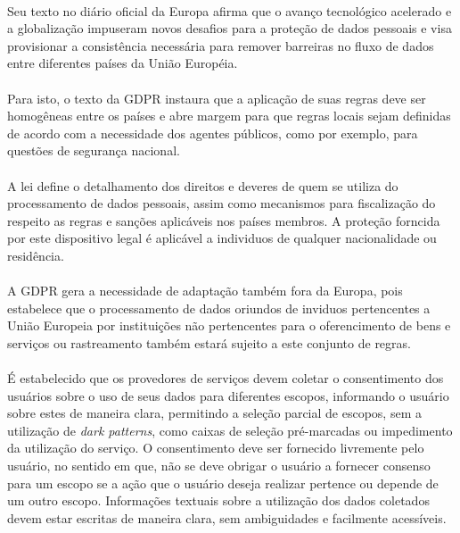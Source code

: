 \paragraph{} Seu texto no diário oficial da Europa afirma que o avanço tecnológico acelerado
e a globalização impuseram novos desafios para a proteção de dados pessoais\cite{eu-2016-679} e visa provisionar a consistência necessária para remover barreiras no fluxo de dados entre diferentes países da União Européia. 

\paragraph{} Para isto, o texto da GDPR instaura que a aplicação de suas regras deve ser homogêneas entre os países e abre margem para que regras locais sejam definidas de acordo com a necessidade dos agentes públicos, como por exemplo, para questões de segurança nacional.

\paragraph{} A lei define o detalhamento dos direitos e deveres de quem se utiliza do processamento de dados pessoais, assim como mecanismos para fiscalização do respeito as regras e sanções aplicáveis nos países membros. A proteção forncida por este dispositivo legal é aplicável a individuos de qualquer nacionalidade ou residência.

\paragraph{} A GDPR gera a necessidade de adaptação também fora da Europa, pois estabelece que o processamento de dados oriundos de inviduos pertencentes a União Europeia por instituições não pertencentes para o oferencimento de bens e serviços ou rastreamento também estará sujeito a este conjunto de regras.

\paragraph{} É estabelecido que os provedores de serviços devem coletar o consentimento dos usuários sobre o uso de seus dados para diferentes escopos, informando o usuário sobre estes de maneira clara, permitindo a seleção parcial de escopos, sem a utilização de \textit{dark patterns}, como caixas de seleção pré-marcadas ou impedimento da utilização do serviço. O consentimento deve ser fornecido livremente pelo usuário, no sentido em que, não se deve obrigar o usuário a fornecer consenso para um escopo se a ação que o usuário deseja realizar pertence ou depende de um outro escopo. Informações textuais sobre a utilização dos dados coletados devem estar escritas de maneira clara, sem ambiguidades e facilmente acessíveis.

